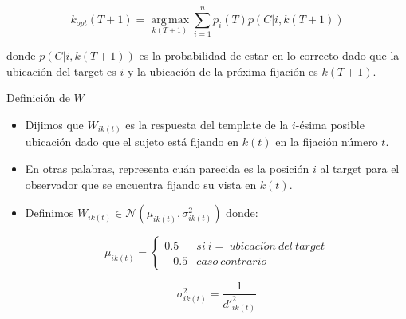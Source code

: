 \documentclass[compress]{beamer}
\DeclareMathOperator*{\argmax}{arg\,max}
\begin{document}




\begin{frame}

$$k_{opt}(T+1) = \argmax\limits_{k(T+1)} \sum_{i=1}^n p_i(T)p(C|i,k(T+1))$$

donde $p(C|i,k(T+1))$ es la probabilidad de estar en lo correcto dado que la ubicación del target es $i$ y la ubicación de la próxima fijación es $k(T+1)$.
\end{frame}

\begin{frame}{Definición de $W$}
\begin{itemize}
\item Dijimos que $W_{ik(t)}$ es la respuesta del template de la $i$-ésima posible ubicación dado que el sujeto está fijando en $k(t)$ en la fijación número $t$. 

\item En otras palabras, representa cuán parecida es la posición $i$ al target para el observador que se encuentra fijando su vista en $k(t)$. 
\item Definimos $W_{ik(t)} \in \mathcal{N}(\mu_{ik(t)}, \sigma^2_{ik(t)})$ donde:

$$ \mu_{ik(t)}
= \left\{ \begin{array}{lc}
             0.5 &  si \ i = \ ubicaci\acute{o}n \ del \ target \\
             -0.5 &  caso \ contrario 
          \end{array}
   \right.$$

$$ \sigma^2_{ik(t)} = \displaystyle\frac{1}{d'^2_{ik(t)}}$$ 
\end{itemize}
\end{frame}
\end{document}
